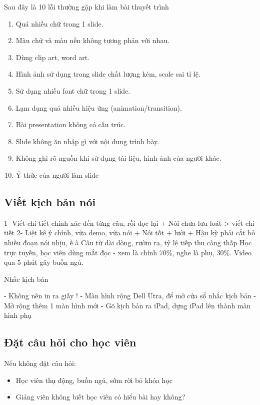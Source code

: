 Sau đây là 10 lỗi thường gặp khi làm bài thuyết trình

\begin{enumerate}
  \item Quá nhiều chữ trong 1 slide.
  \item Màu chữ và màu nền không tương phản với nhau.
  \item Dùng clip art, word art.
  \item Hình ảnh sử dụng trong slide chất lượng kém, scale sai tỉ lệ.
  \item Sử dụng nhiều font chữ trong 1 slide.
  \item Lạm dụng quá nhiều hiệu ứng (animation/transition).
  \item Bài presentation không có cấu trúc.
  \item Slide không ăn nhập gì với nội dung trình bày.
  \item Không ghi rõ nguồn khi sử dụng tài liệu, hình ảnh của người khác.
  \item Ý thức của người làm slide
\end{enumerate}

\subsection{Viết kịch bản nói}

1- Viết chi tiết chính xác đến từng câu, rồi đọc lại
+ Nói chưa lưu loát > viết chi tiết
2- Liệt kê ý chính, vừa demo, vừa nói
+ Nói tốt + lười
+ Hậu kỳ phải cắt bỏ nhiều đoạn nói nhịu, ề à
Câu từ dài dòng, rườm ra, tỷ lệ tiếp thu càng thấp
Học trực tuyến, học viên dùng mắt đọc - xem là chính 70\%, nghe là phụ, 30\%. Video qua 5 phút gây buồn ngủ.

Nhắc kịch bản

- Không nên in ra giấy !
- Màn hình rộng Dell Utra, để mở cửa sổ nhắc kịch bản
- Mở rộng thêm 1 màn hình mới
- Gõ kịch bản ra iPad, dựng iPad lên thành màn hình phụ

\subsection{Đặt câu hỏi cho học viên}

Nếu không đặt câu hỏi:

\begin{itemize}
  \item Học viên thụ động, buồn ngủ, sớm rời bỏ khóa học
  \item Giảng viên không biết học viên có hiểu bài hay không?
\end{itemize}

